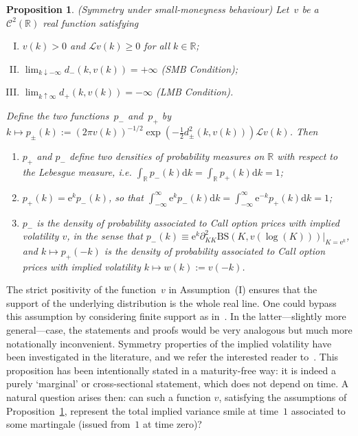 \documentclass{amsart}[11pt]
\numberwithin{equation}{section}
\newtheorem{proposition}[theorem]{Proposition}
\theoremstyle{definition}
\newcommand{\D}{\mathrm{d}}
\newcommand{\RR}{\mathbb{R}}
\newcommand{\Ll}{\mathcal{L}}
\newcommand{\Cc}{\mathcal{C}}
\newcommand{\BS}{\mathrm{BS}}
\newcommand{\E}{\mathrm{e}}
\begin{document}
\begin{proposition} \label{prop:nomass} (Symmetry under small-moneyness behaviour)
Let~$v$ be a $\Cc^2(\RR)$ real function satisfying
\begin{enumerate}[(I)]
\item $v(k)>0$ and $\Ll v (k) \geq 0$ for all $k \in \mathbb{R}$;
\item $\lim_{k\downarrow -\infty} d_-(k, v(k))=+\infty$ (SMB Condition);
\item $\lim_{k \uparrow \infty} d_+(k, v(k)) = -\infty$ (LMB Condition).
\end{enumerate}
Define the two functions~$p_-$ and~$p_+$ by
$k\mapsto p_{\pm}(k) := \left(2 \pi v(k)\right)^{-1/2}\exp\left(-\frac{1}{2}d_{\pm}^2(k,v(k))\right) \Ll v(k)$.
Then
\begin{enumerate}
\item $p_{+}$ and $p_-$ define two densities of probability measures on $\RR$ with respect to the Lebesgue measure, 
i.e. $\int_{\RR} p_-(k) \D k=\int_{\RR} p_+(k) \D k=1$;
\item $p_+(k) = \E^{k} p_-(k)$, so that $\int_{-\infty}^\infty \E^{k} p_-(k) \D k=\int_{-\infty}^\infty \E^{-k} p_+(k) \D k= 1$;
\item $p_-$ is the density of probability associated to Call option prices with implied volatility $v$,
in the sense that 
$p_-(k)\equiv \E^{k}\partial^2_{KK} \BS(K, v(\log(K)))|_{K=\E^{k}}$, 
and $k\mapsto p_+(-k)$ is the density of probability associated to Call option prices with implied volatility 
$k\mapsto w(k):=v(-k)$.
\end{enumerate}
\end{proposition}
The strict positivity of the function~$v$ in Assumption~(I) ensures that the support of the underlying distribution is the whole real line.
One could bypass this assumption by considering  finite support as in~\cite{RT10}.
In the latter---slightly more general---case, the statements and proofs would be very analogous but much more notationally inconvenient.
Symmetry properties of the implied volatility have been investigated in the literature, and we refer the interested reader
to~\cite{CarrLee, GuliSym, RT}.
This proposition has been intentionally stated in a maturity-free way: it is indeed a purely `marginal' or cross-sectional statement,
which does not depend on time. 
A natural question arises then: can such a function $v$, satisfying the assumptions of Proposition~\ref{prop:nomass},
represent the total implied variance smile at time~$1$ associated to some martingale 
(issued from~$1$ at time zero)? 
\end{document}
